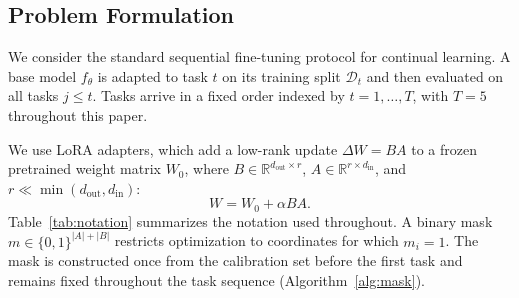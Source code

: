 




\subsection{Problem Formulation}
\label{sec:problem}

We consider the standard sequential fine-tuning protocol for continual
learning. A base model $f_\theta$ is adapted
to task $t$ on its training split $\mathcal{D}_t$ and then evaluated on all
tasks $j \leq t$. Tasks arrive in a fixed order indexed by
$t = 1, \dots, T$, with $T=5$ throughout this paper.

We use LoRA adapters, which add a low-rank update
$\Delta W = BA$ to a frozen pretrained weight matrix $W_0$, where
$B \in \mathbb{R}^{d_{\mathrm{out}} \times r}$,
$A \in \mathbb{R}^{r \times d_{\mathrm{in}}}$, and
$r \ll \min(d_{\mathrm{out}}, d_{\mathrm{in}})$:
\begin{equation}
    W = W_0 + \alpha BA.
\end{equation}
Table~\ref{tab:notation} summarizes the notation used throughout.
A binary mask $m \in \{0,1\}^{|A|+|B|}$ restricts optimization to
coordinates for which $m_i=1$. The mask is constructed once from the
calibration set before the first task and remains fixed throughout the
task sequence (Algorithm~\ref{alg:mask}).

